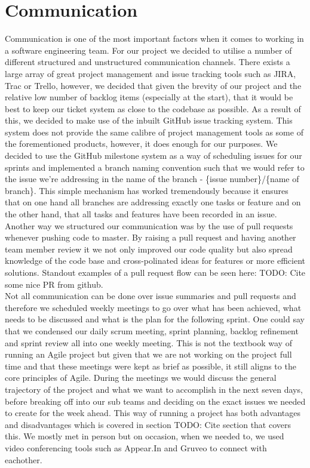 \documentclass[a4paper]{report}
\begin{document}
	
	\section{Communication}
	
	Communication is one of the most important factors when it comes to working in a software engineering team. For our project we decided to utilise a number of different structured and unstructured communication channels. There exists a large array of great project management and issue tracking tools such as JIRA, Trac or Trello, however, we decided that given the brevity of our project and the relative low number of backlog items (especially at the start), that it would be best to keep our ticket system as close to the codebase as possible. As a result of this, we decided to make use of the inbuilt GitHub issue tracking system. This system does not provide the same calibre of project management tools as some of the forementioned products, however, it does enough for our purposes. We decided to use the GitHub milestone system as a way of scheduling issues for our sprints and implemented a branch naming convention such that we would refer to the issue we're addressing in the name of the branch - \{issue number\}/\{name of branch\}. This simple mechanism has worked tremendously because it ensures that on one hand all branches are addressing exactly one tasks or feature and on the other hand, that all tasks and features have been recorded in an issue. \\
	
	Another way we structured our communication was by the use of pull requests whenever pushing code to master. By raising a pull request and having another team member review it we not only improved our code quality but also spread knowledge of the code base and cross-polinated ideas for features or more efficient solutions. Standout examples of a pull request flow can be seen here: TODO: Cite some nice PR from github.\\
	
	Not all communication can be done over issue summaries and pull requests and therefore we scheduled weekly meetings to go over what has been achieved, what needs to be discussed and what is the plan for the following sprint. One could say that we condensed our daily scrum meeting, sprint planning, backlog refinement and sprint review all into one weekly meeting. This is not the textbook way of running an Agile project but given that we are not working on the project full time and that these meetings were kept as brief as possible, it still aligns to the core principles of Agile. During the meetings we would discuss the general trajectory of the project and what we want to accomplish in the next seven days, before breaking off into our sub teams and deciding on the exact issues we needed to create for the week ahead. This way of running a project has both advantages and disadvantages which is covered in section 
	TODO: Cite section that covers this. We mostly met in person but on occasion, when we needed to, we used video conferencing tools such as Appear.In and Gruveo to connect with eachother.\\
	
\end{document}
